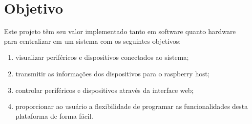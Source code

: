 \documentclass[../../layout.tex]{subfiles}
\begin{document}
\section{Objetivo}
\hspace*{3em}Este projeto têm seu valor implementado tanto em software quanto hardware para centralizar em um sistema com os seguintes objetivos:
\begin{enumerate}[label=\alph*)]
\itemsep0em
\item visualizar periféricos e dispositivos conectados ao sistema;
\item transmitir as informações dos dispositivos para o raspberry host;
\item controlar periféricos e dispositivos através da interface web;
\item proporcionar ao usuário a flexibilidade de programar as funcionalidades desta plataforma de forma fácil.
\end{enumerate}
\end{document}
